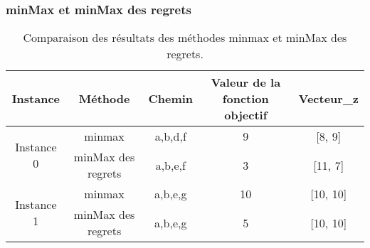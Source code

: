 \documentclass[10pt,a4paper]{report}
\begin{document}
\subsubsection{minMax et minMax des regrets}
\begin{table}[h!]
\centering
\renewcommand{\arraystretch}{1.5} %
\begin{tabular}{|c|c|c|c|c|}
\hline
\textbf{Instance} & \textbf{Méthode}        & \textbf{Chemin}  & \textbf{Valeur de la fonction objectif} & \textbf{Vecteur\_z} \\ \hline
\multirow{2}{*}{Instance 0} 
                  & minmax                  & a,b,d,f          & 9             & [8, 9]              \\ \cline{2-5}
                  & minMax des regrets      & a,b,e,f          & 3             & [11, 7]             \\ \hline
\multirow{2}{*}{Instance 1} 
                  & minmax                  & a,b,e,g          & 10            & [10, 10]            \\ \cline{2-5}
                  & minMax des regrets      & a,b,e,g          & 5             & [10, 10]            \\ \hline
\end{tabular}
\caption{Comparaison des résultats des méthodes minmax et minMax des regrets.}
\label{tab:resultats}
\end{table}
\end{document}
